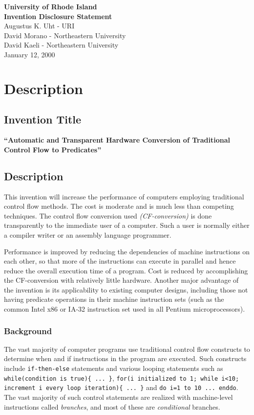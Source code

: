 \documentclass[10pt,dvips]{article}
\begin{document}
\begin{center}
{\Large \bf University of Rhode Island}\\
{\Large \bf Invention Disclosure Statement}\\
\vspace{0.1in}
Augustus K. Uht - URI\\
David Morano - Northeastern University\\
David Kaeli - Northeastern University\\
January 12, 2000
\end{center}

\section{Description}
\subsection{Invention Title}
{\bf ``Automatic and Transparent Hardware Conversion of
Traditional Control Flow to Predicates''}


\subsection{Description}
\label{desc}
This invention will increase the performance of
computers employing traditional control flow methods. The
cost is moderate and is much
less than competing techniques.
The control flow
conversion used {\it (CF-conversion)} is done transparently to the immediate
user of a computer. Such a user is normally either a compiler writer or an
assembly language programmer.

Performance is improved
by reducing the dependencies of machine instructions on each other, so
that more of the instructions can execute in parallel and hence reduce the
overall execution time of a program. Cost is reduced by accomplishing the
CF-conversion with relatively little hardware. Another major advantage
of the invention is its applicability to existing computer designs, including those
not having predicate operations in their machine instruction sets (such as the
common Intel x86 or IA-32 instruction set used in all Pentium microprocessors).

\subsubsection{Background}
The vast majority of computer programs use traditional control flow
constructs to determine when and if instructions in the program are
executed. Such constructs include {\tt if-then-else} statements and
various looping statements such as {\tt while(condition is true)\{ ... \}},
{\tt for(i initialized to 1; while i<10; increment
i every loop iteration)\{ ... \}} and {\tt do i=1 to 10 ... enddo}.
The vast majority of such control statements are realized with machine-level
instructions called {\it branches}, and most of these are {\it conditional} branches.
\end{document}
